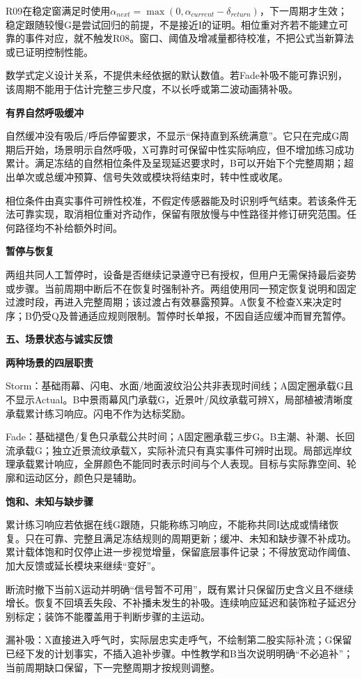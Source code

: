 \documentclass[11pt,a4paper]{article}
\newcommand{\reviewsection}[1]{\par\Needspace{6\baselineskip}\begin{center}{\titlelatin\titlecjk\bfseries\fontsize{14}{20}\selectfont #1}\end{center}}
\newcommand{\reviewsubsection}[1]{\par\Needspace{4\baselineskip}\begin{center}{\titlelatin\titlecjk\bfseries\fontsize{12}{18}\selectfont #1}\end{center}}
\begin{document}
R09在稳定窗满足时使用$\alpha_{next}=\max(0,\alpha_{current}-\delta_{return})$，下一周期才生效；稳定跟随较慢G是尝试回归的前提，不是接近I的证明。相位重对齐若不能建立可靠的事件对应，就不触发R08。窗口、阈值及增减量都待校准，不把公式当新算法或已证明控制性能。

数学式定义设计关系，不提供未经依据的默认数值。若Fade补吸不能可靠识别，该周期不能用于估计完整三步尺度，不以长呼或第二波动画猜补吸。

\reviewsubsection{4.2 有界自然呼吸缓冲}
自然缓冲没有吸后/呼后停留要求，不显示“保持直到系统满意”。它只在完成G周期后开始，场景明示自然呼吸，X可靠时可保留中性实际响应，但不增加练习成功累计。满足冻结的自然相位条件及呈现延迟要求时，B可以开始下个完整周期；超出单次或总缓冲预算、信号失效或模块将结束时，转中性或收尾。

相位条件由真实事件可辨性校准，不假定传感器能及时识别呼气结束。若该条件无法可靠实现，取消相位重对齐动作，保留有限放慢与中性路径并修订研究范围。任何路径均不补给额外时间。

\reviewsubsection{4.3 暂停与恢复}
两组共同人工暂停时，设备是否继续记录遵守已有授权，但用户无需保持最后姿势或步骤。当前周期中断后不在恢复时强制补齐。两组使用同一预定恢复说明和固定过渡时段，再进入完整周期；该过渡占有效暴露预算。A恢复不检查X来决定时序；B仍受Q及普通适应规则限制。暂停时长单报，不因自适应缓冲而冒充暂停。

\reviewsection{五、场景状态与诚实反馈}
\reviewsubsection{5.1 两种场景的四层职责}
Storm：基础雨幕、闪电、水面/地面波纹沿公共非表现时间线；A固定圈承载G且不显示Actual。B中景雨幕风门承载G，近景叶/风纹承载可辨X，局部植被清晰度承载累计练习响应。闪电不作为达标奖励。

Fade：基础褪色/复色只承载公共时间；A固定圈承载三步G。B主潮、补潮、长回流承载G；独立近景流纹承载X，实际补流只有真实事件可辨时出现。局部远岸纹理承载累计响应，全屏颜色不能同时表示时间与个人表现。目标与实际靠空间、轮廓和运动区分，颜色只是辅助。

\reviewsubsection{5.2 饱和、未知与缺步骤}
累计练习响应若依据在线G跟随，只能称练习响应，不能称共同I达成或情绪恢复。只在可靠、完整且满足冻结规则的周期更新；缓冲、未知和缺步骤不补成功。累计载体饱和时仅停止进一步视觉增量，保留底层事件记录；不得放宽动作阈值、加大反馈或延长模块来继续“变好”。

断流时撤下当前X运动并明确“信号暂不可用”，既有累计只保留历史含义且不继续增长。恢复不回填丢失段、不补播未发生的补吸。连续响应延迟和装饰粒子延迟分别标定；装饰不能覆盖用于判断步骤的主运动。

漏补吸：X直接进入呼气时，实际层忠实走呼气，不绘制第二股实际补流；G保留已经下发的计划事实，不插入追补步骤。中性教学和B当次说明明确“不必追补”；当前周期缺口保留，下一完整周期才按规则调整。
\end{document}
